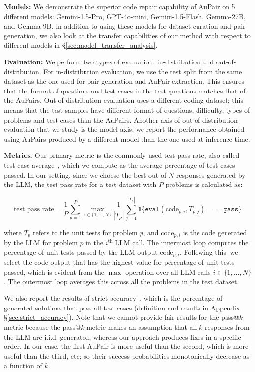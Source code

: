 \documentclass[11pt, a4paper, logo, copyright]{googledeepmind}
\def\aupair/{\textcolor{golden}{Au}Pair}
\def\aupairs/{\textcolor{golden}{Au}Pairs}
\begin{document}
\textbf{Models:} We demonstrate the superior code repair capability of \aupair/ on 5 different models: Gemini-1.5-Pro, GPT-4o-mini, Gemini-1.5-Flash, Gemma-27B, and Gemma-9B. In addition to using these models for dataset curation and pair generation, we also look at the transfer capabilities of our method with respect to different models in \S\ref{sec:model_transfer_analysis}.

\textbf{Evaluation:} We perform two types of evaluation: in-distribution and out-of-distribution. For in-distribution evaluation, we use the test split from the same dataset as the one used for pair generation and \aupair/ extraction. This ensures that the format of questions and test cases in the test questions matches that of the \aupairs/. Out-of-distribution evaluation uses a different coding dataset; this means that the test samples have different format of questions, difficulty, types of problems and test cases than the \aupairs/. Another axis of out-of-distribution evaluation that we study is the model axis: we report the performance obtained using \aupairs/ produced by a different model than the one used at inference time.

\textbf{Metrics:} Our primary metric is the commonly used test pass rate, also called test case average~\citep{hendrycks2021measuring,10.1145/3697010,wu2024benchmarking}, which we compute as the average percentage of test cases passed. In our setting, since we choose the best out of $N$ responses generated by the LLM, the test pass rate for a test dataset with $P$ problems is calculated as: 

$$\text{test pass rate} = \frac{1}{P}\sum_{p=1}^{P}\max_{i \in \{1, \ldots, N\}} \frac{1}{|T_p|} \sum_{j=1}^{|T_p|} \mathbb{1} \{ \texttt{eval}(\text{code}_{p, i}, T_{p, j}) == \texttt{pass} \}$$

where $T_p$ refers to the unit tests for problem $p$, and $\text{code}_{p, i}$ is the code generated by the LLM for problem $p$ in the $i^{\text{th}}$ LLM call. The innermost loop computes the percentage of unit tests passed by the LLM output $\text{code}_{p, i}$. Following this, we select the code output that has the highest value for percentage of unit tests passed, which is evident from the $\max$ operation over all LLM calls $i \in \{ 1, \ldots, N \}$. The outermost loop averages this across all the problems in the test dataset.

We also report the results of strict accuracy~\citep{hendrycks2021measuring}, which is the percentage of generated solutions that pass all test cases (definition and results in Appendix \S\ref{sec:strict_accuracy}). Note that we cannot provide fair results for the pass@$k$ metric because the pass@$k$ metric makes an assumption that all $k$ responses from the LLM are i.i.d. generated, whereas our approach produces fixes in a specific order. In our case, the first \aupair/ is more useful than the second, which is more useful than the third, etc; so their success probabilities monotonically decrease as a function of $k$. 
\end{document}
